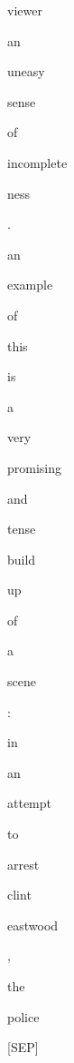 \documentclass[varwidth=150mm]{standalone}
\begin{document}
\begin{CJK*}{UTF8}{gbsn}
{{{\colorbox{red!2.383265495300293}{\strut viewer} \colorbox{red!2.844313144683838}{\strut an} \colorbox{red!2.2137134075164795}{\strut uneasy} \colorbox{red!1.4420899152755737}{\strut sense} \colorbox{red!2.097508668899536}{\strut of} \colorbox{red!4.65457010269165}{\strut incomplete}\colorbox{red!4.351855278015137}{\strut ness} \colorbox{red!0.0}{\strut .} \colorbox{red!6.9635443687438965}{\strut an} \colorbox{red!5.604557991027832}{\strut example} \colorbox{red!5.536593437194824}{\strut of} \colorbox{red!10.300142288208008}{\strut this} \colorbox{red!9.093750953674316}{\strut is} \colorbox{red!7.859950065612793}{\strut a} \colorbox{red!6.399670600891113}{\strut very} \colorbox{red!5.440555572509766}{\strut promising} \colorbox{red!8.877264022827148}{\strut and} \colorbox{red!14.346294403076172}{\strut tense} \colorbox{red!1.6763978004455566}{\strut build}\colorbox{red!13.519696235656738}{\strut up} \colorbox{red!10.047389030456543}{\strut of} \colorbox{red!9.410699844360352}{\strut a} \colorbox{red!49.53892517089844}{\strut scene} \colorbox{red!17.963869094848633}{\strut :} \colorbox{red!2.9917120933532715}{\strut in} \colorbox{red!1.6945576667785645}{\strut an} \colorbox{red!0.0}{\strut attempt} \colorbox{red!0.0}{\strut to} \colorbox{red!0.0}{\strut arrest} \colorbox{red!2.582686424255371}{\strut clint} \colorbox{red!21.70043182373047}{\strut eastwood} \colorbox{red!1.1524946689605713}{\strut ,} \colorbox{red!5.275084018707275}{\strut the} \colorbox{red!9.285717010498047}{\strut police} \colorbox{red!5.619809627532959}{\strut [SEP]}
}}}
\end{CJK*}
\end{document}
